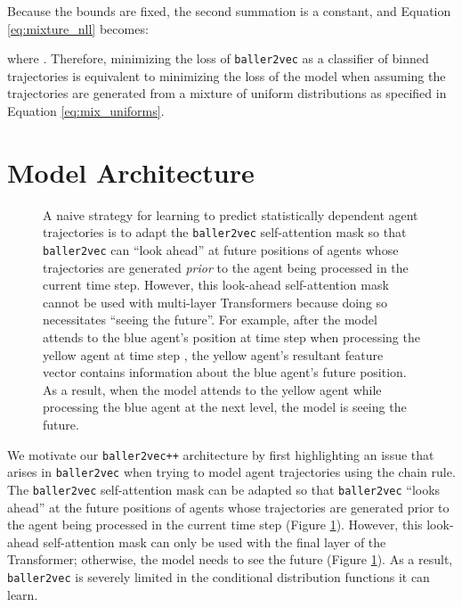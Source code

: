 \documentclass{article}
\newcommand{\btv}{\texttt{baller2vec}}
\newcommand{\btvpp}{\texttt{baller2vec++}}
\begin{document}
\noindent
Because the bounds are fixed, the second summation is a constant, and Equation \eqref{eq:mixture_nll} becomes:



\noindent
where .
Therefore, minimizing the loss of \btv{} as a classifier of binned trajectories is equivalent to minimizing the loss of the model when assuming the trajectories are generated from a mixture of uniform distributions as specified in Equation \eqref{eq:mix_uniforms}. 
\section{Model Architecture}\label{sec:baller2vec++}
\begin{figure}[ht]
\centering
{}
\vskip -0.1in
\caption{A naive strategy for learning to predict statistically dependent agent trajectories is to adapt the \btv{} self-attention mask so that \btv{} can ``look ahead'' at future positions of agents whose trajectories are generated \textit{prior} to the agent being processed in the current time step.
However, this look-ahead self-attention mask cannot be used with multi-layer Transformers because doing so necessitates ``seeing the future''.
For example, after the model attends to the blue agent's position at time step  when processing the yellow agent at time step , the yellow agent's resultant feature vector contains information about the blue agent's future position.
As a result, when the model attends to the yellow agent while processing the blue agent at the next level, the model is seeing the future.
}
\label{fig:information_leak}
\end{figure}
\vskip -0.1in

We motivate our \btvpp{} architecture by first highlighting an issue that arises in \btv{} when trying to model agent trajectories using the chain rule.
The \btv{} self-attention mask can be adapted so that \btv{} ``looks ahead'' at the future positions of agents whose trajectories are generated prior to the agent being processed in the current time step (Figure \ref{fig:information_leak}).
However, this look-ahead self-attention mask can only be used with the final layer of the Transformer; otherwise, the model needs to see the future (Figure \ref{fig:information_leak}).
As a result, \btv{} is severely limited in the conditional distribution functions it can learn.
\end{document}
